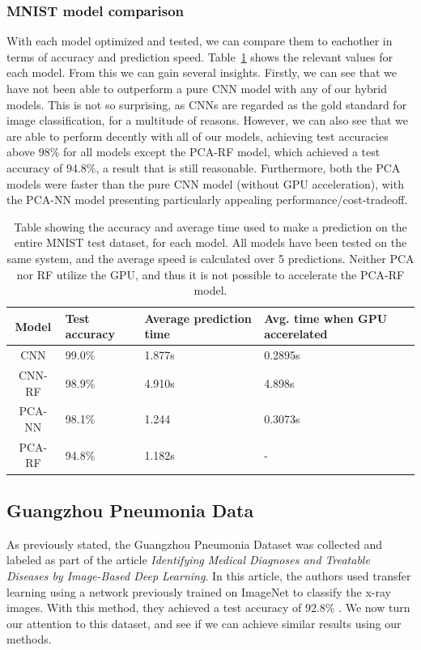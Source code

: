\documentclass[onecolumn,10pt,cleanfoot]{asme2ej}
\begin{document}
\subsubsection{MNIST model comparison}

With each model optimized and tested, we can compare them to eachother in terms of accuracy and prediction speed. Table~\ref{modcompmnist} shows the relevant values for each model. From this we can gain several insights. Firstly, we can see that we have not been able to outperform a pure CNN model with any of our hybrid models. This is not so surprising, as CNNs are regarded as the gold standard for image classification, for a multitude of reasons. However, we can also see that we are able to perform decently with all of our models, achieving test accuracies above $98\%$ for all models except the PCA-RF model, which achieved a test accuracy of $94.8\%$, a result that is still reasonable. Furthermore, both the PCA models were faster than the pure CNN model (without GPU acceleration), with the PCA-NN model presenting particularly appealing performance/cost-tradeoff.

\begin{table}[H]
\caption{Table showing the accuracy and average time used to make a prediction on the entire MNIST test dataset, for each model. All models have been tested on the same system, and the average speed is calculated over 5 predictions. Neither PCA nor RF utilize the GPU, and thus it is not possible to accelerate the PCA-RF model.}
\begin{center}
\label{modcompmnist}
\begin{tabular}{| c | l | l | l |}
\hline
Model & Test accuracy & Average prediction time & Avg. time when GPU accerelated \\
\hline
CNN & 99.0\% & 1.877s & 0.2895s \\
CNN-RF & 98.9\% & 4.910s & 4.898s \\
PCA-NN & 98.1\% & 1.244 & 0.3073s \\
PCA-RF & 94.8\% & 1.182s & - \\
\hline
\end{tabular}
\end{center}
\end{table}

\subsection{Guangzhou Pneumonia Data}

As previously stated, the Guangzhou Pneumonia Dataset was collected and labeled as part of the article {\it Identifying Medical Diagnoses and Treatable Diseases by Image-Based Deep Learning}. In this article, the authors used transfer learning using a network previously trained on ImageNet to classify the x-ray images. With this method, they achieved a test accuracy of $92.8\%$ \cite[1127]{xray}. We now turn our attention to this dataset, and see if we can achieve similar results using our methods.
\end{document}
